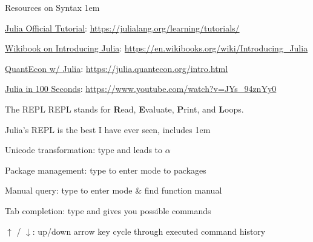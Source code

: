 \documentclass[11pt,aspectratio=43,usenames,dvipsnames]{beamer}
\newcommand{\blue}[1]{\textcolor{blue}{#1}}
\let\olditemize=\itemize
\let\endolditemize=\enditemize
\renewenvironment{itemize}{\olditemize \itemsep1em}{\endolditemize}
\theoremstyle{definition}
\begin{document}
\begin{frame}{Resources on Syntax}
\label{slide:Resources_on_Syntax}
    \begin{itemize}
        \item \blue{\href{https://docs.julialang.org/en/v1/manual/getting-started/}{Julia Official Tutorial}}: \tiny \url{https://julialang.org/learning/tutorials/}
        \normalsize
        \item \blue{\href{https://en.wikibooks.org/wiki/Introducing_Julia}{Wikibook on Introducing Julia}}: \tiny{\url{https://en.wikibooks.org/wiki/Introducing_Julia}}
        \normalsize
        \item \blue{\href{https://julia.quantecon.org/intro.html}{QuantEcon w/ Julia}}: \tiny{\url{https://julia.quantecon.org/intro.html}}
        \normalsize
        \item \blue{ \href{https://www.youtube.com/watch?v=JYs_94znYy0}{Julia in 100 Seconds}}: \tiny{\url{https://www.youtube.com/watch?v=JYs_94znYy0}}
    \end{itemize}
\end{frame}

\begin{frame}{The REPL}
\label{slide:The_REPL}
    REPL stands for \textbf{R}ead, \textbf{E}valuate, \textbf{P}rint, and \textbf{L}oops.

    Julia's REPL is the best I have ever seen, includes
    \begin{itemize}
        \item Unicode transformation: type \juliainline{\alpha} and  leads to $ \alpha $
        \item Package management: type \juliainline{]} to enter  mode to  packages
        \item Manual query: type  to enter  mode \& find function manual
        \item Tab completion: type \juliainline{\al} and  gives you possible commands
        \item $ \uparrow  $ / $ \downarrow  $: up/down arrow key cycle through executed command history
    \end{itemize}

\end{frame}
\end{document}

